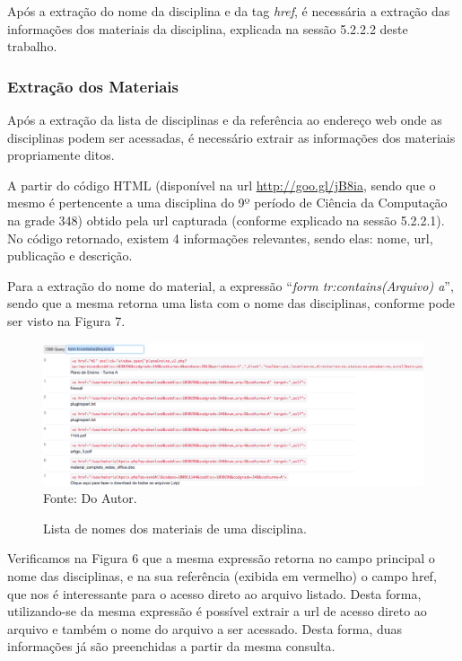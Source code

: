 Após a extração do nome da disciplina e da tag \emph{href}, é necessária a extração das informações dos materiais da disciplina, explicada na sessão 5.2.2.2 deste trabalho.

\subsubsection{Extração dos Materiais}
Após a extração da lista de disciplinas e da referência ao endereço web onde as disciplinas podem ser acessadas, é necessário extrair as informações dos materiais propriamente ditos.

A partir do código HTML (disponível na url \url{http://goo.gl/jB8ia}, sendo que o mesmo é pertencente a uma disciplina do 9º período de Ciência da Computação na grade 348) obtido pela url capturada (conforme explicado na sessão 5.2.2.1). No código retornado, existem 4 informações relevantes, sendo elas: nome, url, publicação e descrição.

Para a extração do nome do material, a expressão ``\emph{form tr:contains(Arquivo) a}'', sendo que a mesma retorna uma lista com o nome das disciplinas, conforme pode ser visto na Figura 7.

\begin{figure}[!htb]
     \centering
     \caption[Extração de Informações - Lista de Nomes dos Materiais de uma disciplina]{Lista de nomes dos materiais de uma disciplina.}
     \includegraphics[scale=0.35]{imagens/listamateriaisdisciplinasnomematerial.png}
     \\  Fonte: Do Autor.
\end{figure}

Verificamos na Figura 6 que a mesma expressão retorna no campo principal o nome das disciplinas, e na sua referência (exibida em vermelho) o campo href, que nos é interessante para o acesso direto ao arquivo listado. Desta forma, utilizando-se da mesma expressão é possível extrair a url de acesso direto ao arquivo e também o nome do arquivo a ser acessado. Desta forma, duas informações já são preenchidas a partir da mesma consulta. 

